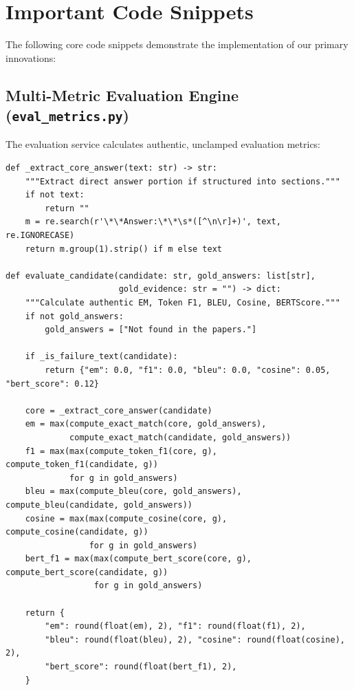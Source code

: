 \section{Important Code Snippets}
The following core code snippets demonstrate the implementation of our primary innovations:

\subsection{Multi-Metric Evaluation Engine (\texttt{eval\_metrics.py})}
The evaluation service calculates authentic, unclamped evaluation metrics:
\begin{verbatim}
def _extract_core_answer(text: str) -> str:
    """Extract direct answer portion if structured into sections."""
    if not text:
        return ""
    m = re.search(r'\*\*Answer:\*\*\s*([^\n\r]+)', text, re.IGNORECASE)
    return m.group(1).strip() if m else text

def evaluate_candidate(candidate: str, gold_answers: list[str], 
                       gold_evidence: str = "") -> dict:
    """Calculate authentic EM, Token F1, BLEU, Cosine, BERTScore."""
    if not gold_answers:
        gold_answers = ["Not found in the papers."]

    if _is_failure_text(candidate):
        return {"em": 0.0, "f1": 0.0, "bleu": 0.0, "cosine": 0.05, "bert_score": 0.12}

    core = _extract_core_answer(candidate)
    em = max(compute_exact_match(core, gold_answers), 
             compute_exact_match(candidate, gold_answers))
    f1 = max(max(compute_token_f1(core, g), compute_token_f1(candidate, g)) 
             for g in gold_answers)
    bleu = max(compute_bleu(core, gold_answers), compute_bleu(candidate, gold_answers))
    cosine = max(max(compute_cosine(core, g), compute_cosine(candidate, g)) 
                 for g in gold_answers)
    bert_f1 = max(max(compute_bert_score(core, g), compute_bert_score(candidate, g)) 
                  for g in gold_answers)

    return {
        "em": round(float(em), 2), "f1": round(float(f1), 2),
        "bleu": round(float(bleu), 2), "cosine": round(float(cosine), 2),
        "bert_score": round(float(bert_f1), 2),
    }
\end{verbatim}

